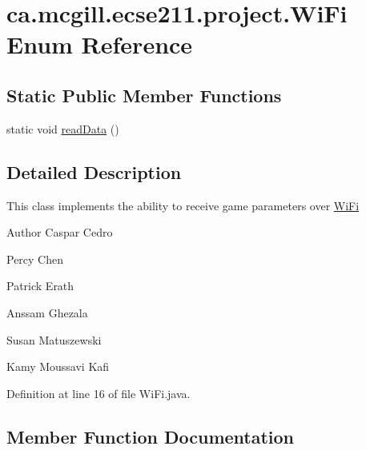 \hypertarget{enumca_1_1mcgill_1_1ecse211_1_1project_1_1_wi_fi}{}\section{ca.\+mcgill.\+ecse211.\+project.\+Wi\+Fi Enum Reference}
\label{enumca_1_1mcgill_1_1ecse211_1_1project_1_1_wi_fi}
\subsection*{Static Public Member Functions}
\begin{DoxyCompactItemize}
\item 
static void \hyperlink{enumca_1_1mcgill_1_1ecse211_1_1project_1_1_wi_fi_a3488726983cda70dbde6f05c9c762f16}{read\+Data} ()
\end{DoxyCompactItemize}


\subsection{Detailed Description}
This class implements the ability to receive game parameters over \hyperlink{enumca_1_1mcgill_1_1ecse211_1_1project_1_1_wi_fi}{Wi\+Fi}

\begin{DoxyAuthor}{Author}
Caspar Cedro 

Percy Chen 

Patrick Erath 

Anssam Ghezala 

Susan Matuszewski 

Kamy Moussavi Kafi 
\end{DoxyAuthor}


Definition at line 16 of file Wi\+Fi.\+java.



\subsection{Member Function Documentation}
\mbox{\label{enumca_1_1mcgill_1_1ecse211_1_1project_1_1_wi_fi_a3488726983cda70dbde6f05c9c762f16}} 
